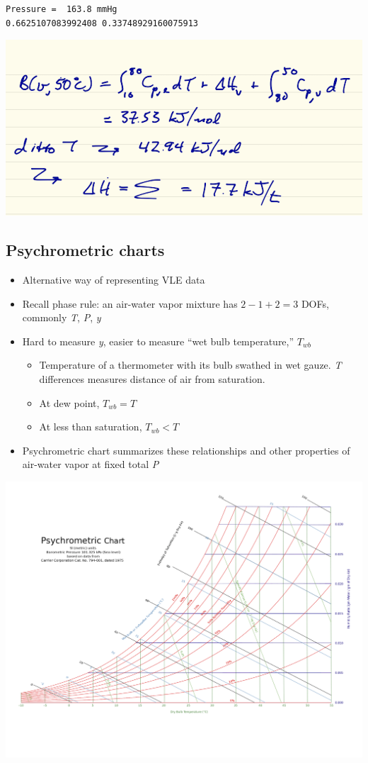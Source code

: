 \documentclass[11pt]{article}
\begin{document}
\begin{verbatim}
Pressure =  163.8 mmHg
0.6625107083992408 0.33748929160075913
\end{verbatim}

\includegraphics[width=.9\linewidth]{./figs/MassEnergy2.png}

\subsection{Psychrometric charts}
\label{sec-10-7}
\begin{itemize}
\item Alternative way of representing VLE data
\item Recall phase rule: an air-water vapor mixture has \(2-1+2 = 3\) DOFs, commonly \emph{T}, \emph{P}, \emph{y}
\item Hard to measure \emph{y}, easier to measure ``wet bulb temperature,'' \(T_{wb}\)
\begin{itemize}
\item Temperature of a thermometer with its bulb swathed in wet gauze.  \emph{T} differences measures distance of air from saturation.
\item At dew point, \(T_{wb} = T\)
\item At less than saturation, \(T_{wb} < T\)
\end{itemize}
\item Psychrometric chart summarizes these relationships and other properties of air-water vapor at fixed total \emph{P}
\end{itemize}

\includegraphics[width=.9\linewidth]{./figs/PsychrometricChart.png}
\end{document}

